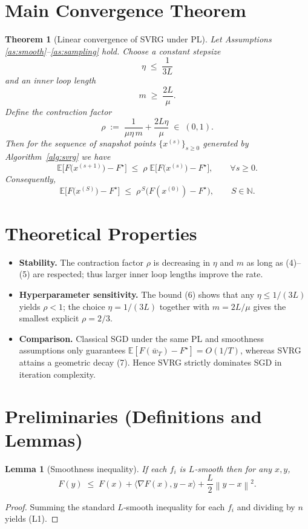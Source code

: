 \documentclass{article}
\newtheorem{theorem}{Theorem}
\newtheorem{lemma}{Lemma}
\newcommand{\EE}{\mathbb{E}}
\newcommand{\norm}[1]{\left\|#1\right\|}
\newcommand{\inner}[2]{\langle #1,#2\rangle}
\begin{document}
\section*{Main Convergence Theorem}
\begin{theorem}[Linear convergence of SVRG under PL]\label{thm:linear}
Let Assumptions \ref{as:smooth}–\ref{as:sampling} hold.
Choose a constant stepsize 
\[
\eta \;\le\; \frac{1}{3L}
\tag{4}
\]
and an inner loop length 
\[
m \;\ge\; \frac{2L}{\mu}.
\tag{5}
\]
Define the contraction factor
\[
\rho \;:=\; \frac{1}{\mu\eta\,m}+ \frac{2L\eta}{\mu}\;\in\;(0,1).
\tag{6}
\]
Then for the sequence of snapshot points $\{x^{(s)}\}_{s\ge0}$ generated by
Algorithm~\ref{alg:svrg} we have
\[
\EE\!\big[F\!\big(x^{(s+1)}\big)-F^\star\big]
\;\le\;
\rho\;
\EE\!\big[F\!\big(x^{(s)}\big)-F^\star\big],
\qquad\forall s\ge0.
\tag{7}
\]
Consequently,
\[
\EE\!\big[F\!\big(x^{(S)}\big)-F^\star\big]\;\le\;
\rho^{\,S}\big(F(x^{(0)})-F^\star\big),\qquad S\in\mathbb N .
\tag{8}
\]
\end{theorem}

\section*{Theoretical Properties}
\begin{itemize}
\item \textbf{Stability.} The contraction factor $\rho$ is decreasing in $\eta$ and $m$ as long as (4)–(5) are respected; thus larger inner loop lengths improve the rate.
\item \textbf{Hyperparameter sensitivity.} The bound (6) shows that any $\eta\le 1/(3L)$ yields $\rho<1$; the choice $\eta=1/(3L)$ together with $m=2L/\mu$ gives the smallest explicit $\rho=2/3$.
\item \textbf{Comparison.} Classical SGD under the same PL and smoothness assumptions only guarantees
$\EE[F(\bar w_T)-F^\star]=O(1/T)$, whereas SVRG attains a geometric decay (7). Hence SVRG strictly dominates SGD in iteration complexity.
\end{itemize}

\section*{Preliminaries (Definitions and Lemmas)}
\begin{lemma}[Smoothness inequality]\label{lem:smooth}
If each $f_i$ is $L$‑smooth then for any $x,y$,
\[
F(y)\;\le\;F(x)+\inner{\nabla F(x)}{y-x}+\frac{L}{2}\norm{y-x}^{2}.
\tag{L1}
\]
\end{lemma}
\begin{proof}
Summing the standard $L$‑smooth inequality for each $f_i$ and dividing by $n$ yields (L1). \hfill\qedsymbol
\end{proof}
\end{document}
